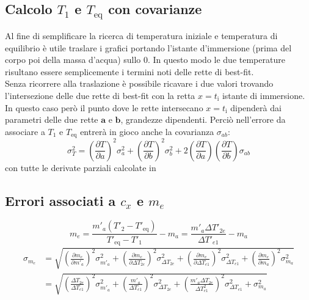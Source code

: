 \documentclass{article}
\begin{document}
	\subsection{Calcolo \(T_{1}\) e \(T_{\text{eq}}\) con covarianze} \label{covarianza}
	Al fine di semplificare la ricerca di temperatura iniziale e temperatura di equilibrio è utile traslare i grafici portando l'istante d'immersione (prima del corpo poi della massa d'acqua) sullo \(0\). In questo modo le due temperature risultano essere semplicemente i termini noti delle rette di best-fit. \\
	
	Senza ricorrere alla traslazione è possibile ricavare i due valori trovando l'intersezione delle due rette di best-fit con la retta \(x=t_{\text{i}}\) istante di immersione. In questo caso però il punto dove le rette intersecano \(x=t_{\text{i}}\) dipenderà dai parametri delle due rette  \(\boldsymbol{a}\) e \(\boldsymbol{b}\), grandezze dipendenti. Perciò nell'errore da associare a \(T_{1}\) e \(T_{\text{eq}}\) entrerà in gioco anche la covarianza \(\sigma_{ab}\):
	\[ 
	\sigma_T^2 = \left(\frac{\partial T}{\partial a}\right)^2 \sigma_a^2 + \left(\frac{\partial T}{\partial b}\right)^2 \sigma_b^2 + 2\left(\frac{\partial T}{\partial a}\right)\left(\frac{\partial T}{\partial b}\right) \sigma_{ab}
	\]
	con tutte le derivate parziali calcolate in 
	
	\subsection{Errori associati a \(c_{x}\) e \(m_{e}\)} 
	\[ 
	m_{e} = \frac{m'_{a}\left(T'_{2} - T'_{\text{eq}}\right)}{T'_{\text{eq}} - T'_{1}} - m_{a} =  \frac{m'_{a}\Delta T'_{2e}}{\Delta T'_{e1}} - m_{a}
	\] \label{sigma me}
	\begin{align*}
		\sigma_{m_e} &= \sqrt{\left(\frac{\partial m_{e}}{\partial m'_{a}}\right)^2\sigma_{m'_{a}}^2 + \left(\frac{\partial m_{e}}{\partial\Delta T_{2e}}\right)^2\sigma_{\Delta T_{2e}}^2 + \left(\frac{\partial m_{e}}{\partial\Delta T_{e1}}\right)^2\sigma_{\Delta T_{e1}}^2 + \left(\frac{\partial m_{e}}{\partial m_{a}}\right)^2\sigma^2_{m_{a}}} \\
					 &= \sqrt{\left(\frac{\Delta T_{2e}}{\Delta T_{e1}}\right)^2\sigma_{m'_{a}}^2 + \left(\frac{m'_{a}}{\Delta T_{e1}}\right)^2\sigma^2_{\Delta T_{2e}} + \left(\frac{m'_{a}\Delta T_{2e}}{\Delta T_{e1}^2}\right)^2\sigma^2_{\Delta T_{e1}}+\sigma^2_{m_{a}}}
	\end{align*}
	\vspace{1cm}
	
\end{document}
